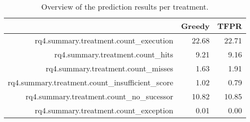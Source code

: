 \begin{table}[ht]
\centering
\begin{tabular}{rrr}
  \hline
 & Greedy & TFPR \\ 
  \hline
rq4.summary.treatment.count\_execution & 22.68 & 22.71 \\ 
  rq4.summary.treatment.count\_hits & 9.21 & 9.16 \\ 
  rq4.summary.treatment.count\_misses & 1.63 & 1.91 \\ 
  rq4.summary.treatment.count\_insufficient\_score & 1.02 & 0.79 \\ 
  rq4.summary.treatment.count\_no\_sucessor & 10.82 & 10.85 \\ 
  rq4.summary.treatment.count\_exception & 0.01 & 0.00 \\ 
   \hline
\end{tabular}
\caption{Overview of the prediction results per treatment.} 
\label{tab:results:rq4:summary:treatment:counts}
\end{table}
